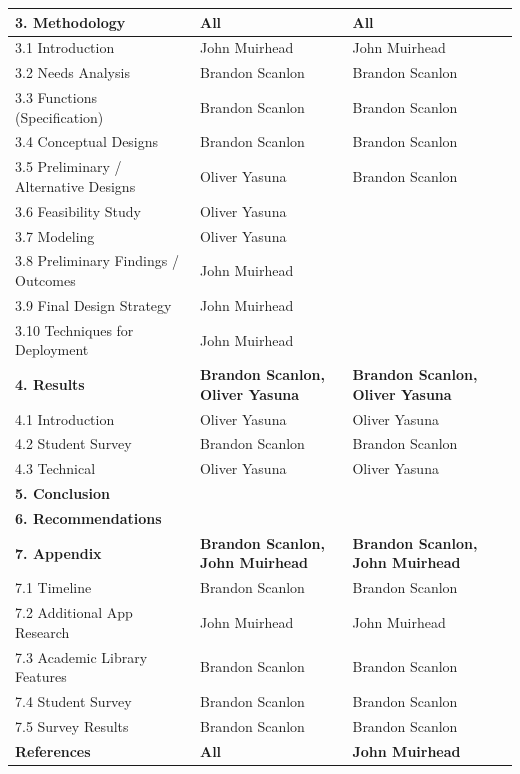 \documentclass[oneside, 12pt]{book}
\begin{document}
\begin{table}[ht]
{\begin{tabular}{| l | l | l | l |}
 \textbf{3. Methodology} &  \textbf{All} &  \textbf{All} \\ \hline
  3.1 Introduction & John Muirhead & John Muirhead \\ \hline
  3.2 Needs Analysis & Brandon Scanlon & Brandon Scanlon \\ \hline
  3.3 Functions (Specification) & Brandon Scanlon & Brandon Scanlon \\ \hline
  3.4 Conceptual Designs & Brandon Scanlon & Brandon Scanlon \\ \hline
  3.5 Preliminary / Alternative Designs & Oliver Yasuna & Brandon Scanlon \\ \hline
  3.6 Feasibility Study & Oliver Yasuna &  \\ \hline
  3.7 Modeling & Oliver Yasuna &  \\ \hline
  3.8 Preliminary Findings / Outcomes & John Muirhead &  \\ \hline
  3.9 Final Design Strategy & John Muirhead &  \\ \hline
  3.10 Techniques for Deployment & John Muirhead &  \\ \hline \hline
 
  \textbf{4. Results} &  \textbf{Brandon Scanlon, Oliver Yasuna} &  \textbf{Brandon Scanlon, Oliver Yasuna} \\ \hline
  4.1 Introduction & Oliver Yasuna & Oliver Yasuna \\ \hline
  4.2 Student Survey & Brandon Scanlon & Brandon Scanlon \\ \hline
  4.3 Technical & Oliver Yasuna & Oliver Yasuna \\ \hline \hline
  
  \textbf{5. Conclusion} &  \textbf{} &  \textbf{} \\ \hline
  
  \hline \hline
  
  \textbf{6. Recommendations} &  \textbf{} &  \textbf{} \\ \hline
  
  \hline \hline
  
  \textbf{7. Appendix} &  \textbf{Brandon Scanlon, John Muirhead} &  \textbf{Brandon Scanlon, John Muirhead} \\ \hline
  7.1 Timeline & Brandon Scanlon & Brandon Scanlon \\ \hline
  7.2 Additional App Research & John Muirhead & John Muirhead \\ \hline
  7.3 Academic Library Features & Brandon Scanlon & Brandon Scanlon \\ \hline
  7.4 Student Survey & Brandon Scanlon & Brandon Scanlon \\ \hline
  7.5 Survey Results & Brandon Scanlon & Brandon Scanlon \\ \hline \hline
  
\textbf{References} &  \textbf{All} &  \textbf{John Muirhead} \\ \hline
  
\hline
\end{tabular}
}
\end{table}
\mainmatter
\end{document}
